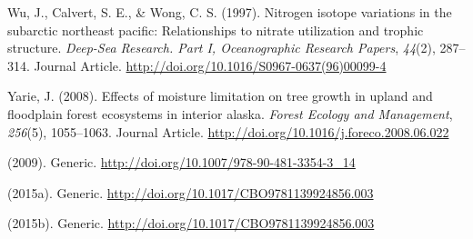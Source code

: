 \documentclass [11pt, proquest] {uwthesis}[2015/03/03]
\begin{document}
\hypertarget{ref-Wu1997}{}
Wu, J., Calvert, S. E., \& Wong, C. S. (1997). Nitrogen isotope
variations in the subarctic northeast pacific: Relationships to nitrate
utilization and trophic structure. \emph{Deep-Sea Research. Part I,
Oceanographic Research Papers}, \emph{44}(2), 287--314. Journal Article.
\url{http://doi.org/10.1016/S0967-0637(96)00099-4}

\hypertarget{ref-Yarie2008}{}
Yarie, J. (2008). Effects of moisture limitation on tree growth in
upland and floodplain forest ecosystems in interior alaska. \emph{Forest
Ecology and Management}, \emph{256}(5), 1055--1063. Journal Article.
\url{http://doi.org/10.1016/j.foreco.2008.06.022}

\hypertarget{ref-Graham2010}{}
(2009). Generic. \url{http://doi.org/10.1007/978-90-481-3354-3_14}

\hypertarget{ref-Du2015}{}
(2015a). Generic. \url{http://doi.org/10.1017/CBO9781139924856.003}

\hypertarget{ref-Frank2015}{}
(2015b). Generic. \url{http://doi.org/10.1017/CBO9781139924856.003}
\end{document}
